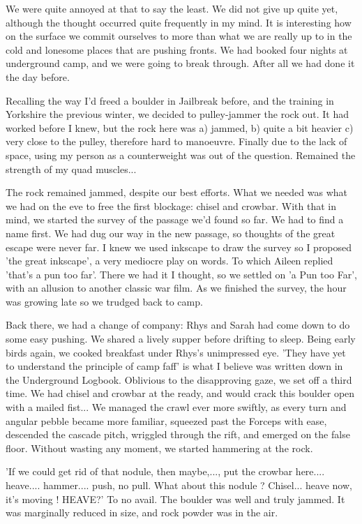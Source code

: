\documentclass[onecolumn]{book}
\begin{document}
We were quite annoyed at that to say the least. We did not give up quite yet, although the thought occurred quite frequently in my mind. It is interesting how on the surface we commit ourselves to more than what we are really up to in the cold and lonesome places that are pushing fronts. We had booked four nights at underground camp, and we were going to break through. After all we had done it the day before.

Recalling the way I'd freed a boulder in Jailbreak before, and the training in Yorkshire the previous winter, we decided to pulley-jammer the rock out. It had worked before I knew, but the rock here was a) jammed, b) quite a bit heavier c) very close to the pulley, therefore hard to manoeuvre. Finally due to the lack of space, using my person as a counterweight was out of the question. Remained the strength of my quad muscles...

The rock remained jammed, despite our best efforts. What we needed was what we had on the eve to free the first blockage: chisel and crowbar. With that in mind, we started the survey of the passage we'd found so far. We had to find a name first. We had dug our way in the new passage, so thoughts of the great escape were never far. I knew we used inkscape to draw the survey so I proposed 'the great inkscape', a very mediocre play on words. To which Aileen replied 'that's a pun too far'. There we had it I thought, so we settled on 'a Pun too Far', with an allusion to another classic war film. As we finished the survey, the hour was growing late so we trudged back to camp.

Back there, we had a change of company: Rhys and Sarah had come down to do some easy pushing. We shared a lively supper before drifting to sleep.
Being early birds again, we cooked breakfast under Rhys's unimpressed eye. 'They have yet to understand the principle of camp faff' is what I believe was written down in the Underground Logbook. Oblivious to the disapproving gaze, we set off a third time. We had chisel and crowbar at the ready, and would crack this boulder open with a mailed fist...
We managed the crawl ever more swiftly, as every turn and angular pebble became more familiar, squeezed past the Forceps with ease, descended the cascade pitch, wriggled through the rift, and emerged on the false floor. Without wasting any moment, we started hammering at the rock. 

'If we could get rid of that nodule, then maybe,..., put the crowbar here.... heave.... hammer.... push, no pull. What about this nodule ? Chisel... heave now, it's moving ! HEAVE?' 
To no avail. The boulder was well and truly jammed. It was marginally reduced in size, and rock powder was in the air.
\end{document}
